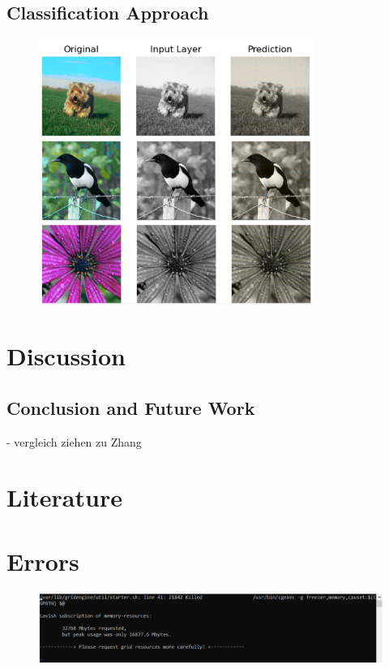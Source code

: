 \documentclass[12pt,letterpaper]{article}
\begin{document}
\subsection{Classification Approach}
\begin{figure}
	\centering
	\includegraphics[width=0.8\textwidth]{classific_predict.png}
	\caption{}
	\label{class}
\end{figure}

\section{Discussion}

\subsection{Conclusion and Future Work}
- vergleich ziehen zu Zhang\\
\newpage
\thispagestyle{empty}
\section{Literature}
\label{Lit}

\renewcommand{\bibsection}{}



\newpage
\appendix
{}
\section{Errors}
\begin{figure}[ht]
	\centering
	\includegraphics[width=1.0\textwidth]{error.png}
	\caption{}
	\label{error}
\end{figure}

	
\end{document}

